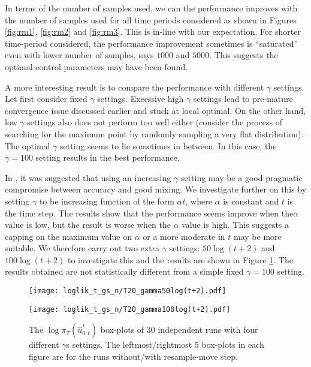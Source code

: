 In terms of the number of samples used, we can the performance improves with the number of samples used for all time periods considered as shown in Figures \ref{fig:rm1}, \ref{fig:rm2} and \ref{fig:rm3}. This is in-line with our expectation. For shorter time-period considered, the performance improvement sometimes is ``saturated'' even with lower number of samples, says $1000$ and $5000$. This suggests the optimal control parameters may have been found.

A more interesting result is to compare the performance with different $\gamma$ settings. Let first consider fixed $\gamma$ settings. Excessive high $\gamma$ settings lead to pre-mature convergence issue discussed earlier and stuck at local optimal. On the other hand, low $\gamma$ settings also does not perform too well either (consider the process of searching for the maximum point by randomly sampling a very flat distribution). The optimal $\gamma$ setting seems to lie sometimes in between. In this case, the $\gamma=100$ setting results in the best performance.

In \cite{NK11}, it was suggested that using an increasing $\gamma$ setting may be a good pragmatic compromise between accuracy and good mixing. We investigate further on this by setting $\gamma$ to be increasing function of the form $\alpha t$, where $\alpha$ is constant and $t$ is the time step. The results show that the performance seems improve when the$\alpha$ value is low, but the result is worse when the $\alpha$ value is high. This suggests a capping on the maximum value on $\alpha$ or a more moderate in $t$ may be more suitable. We therefore carry out two extra $\gamma$ settings: $50\log(t+2)$ and $100\log(t+2)$ to investigate this and the results are shown in Figure \ref{fig:log}. The results obtained are not statistically different from a simple fixed $\gamma=100$ setting.

\begin{figure}[!thbp]
    \centering
    \begin{minipage}{.5\textwidth}
        \centering
        \texttt{[image: loglik\_t\_gs\_n/T20\_gamma50log(t+2).pdf]}
    \end{minipage}%
    \begin{minipage}{0.5\textwidth}
        \centering
        \texttt{[image: loglik\_t\_gs\_n/T20\_gamma100log(t+2).pdf]}
    \end{minipage}
    \caption{The $\log\pi_T(\hat{u}^*_{0:t})$ box-plots of 30 independent runs with four different $\gamma$s settings. The leftmost/rightmost $5$ box-plots in each figure are for the runs without/with resample-move step.}
    \label{fig:log}
\end{figure}

